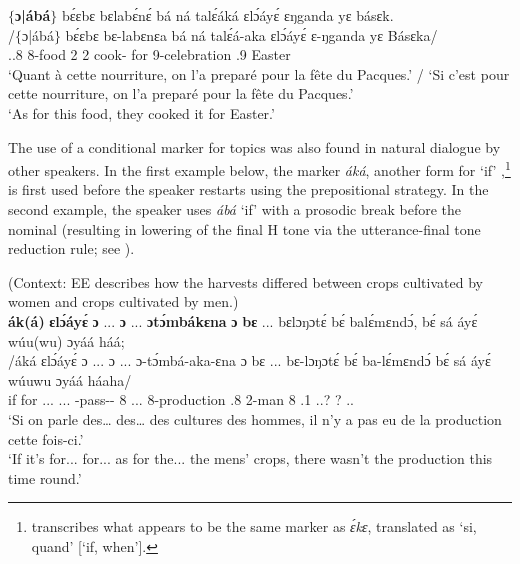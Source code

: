 \documentclass[output=paper,colorlinks,citecolor=brown
]{langscibook}
\begin{document}
\ea
\label{asforfoodaba}
\glll
{\db}\textbf{$\{$ɔ|ábá$\}$} bɛ́ɛbɛ bɛlabɛ́nɛ́ bá ná talɛ́áká ɛlɔ́áyɛ́ ɛŋganda yɛ básɛk. \\
/$\{$ɔ|ábá$\}$ bɛ́ɛbɛ bɛ-labɛnɛa bá ná talɛ́á-aka ɛlɔ́áyɛ́ ɛ-ŋganda yɛ Básɛka/ \\
{\db}\PREP{} \DEM{}.\PROX{}.8{} 8-food 2\SM{} \PST{}2{} cook-\DUR{} for 9-celebration \ASS{}.9 Easter \\
\glt
`Quant à cette nourriture, on l'a preparé pour la fête du Pacques.' / `Si c'est pour cette nourriture, on l'a preparé pour la fête du Pacques.' \\ `As for this food, they cooked it for Easter.' \jambox*{[JO 1650--1] }

\z

The use of a conditional marker for topics was also found in natural dialogue by other speakers. In the first example below, the marker \textit{áká}, another form for `if' \citep[212]{Dugast1971},\footnote{\citet[212, 318]{Dugast1971} transcribes what appears to be the same marker as \textit{ɛ́kɛ}, translated as `si, quand' [`if, when'].} is first used before the speaker restarts using the prepositional strategy. In the second example, the speaker uses \textit{ábá} `if' with a prosodic break before the nominal (resulting in lowering of the final H tone via the utterance-final tone reduction rule; see \citealp[72--74, 82]{KerrFut}).

\ea
(Context: EE describes how the harvests differed between crops cultivated by women and crops cultivated by men.)  \\
\glll
{\db}\textbf{ák(á)} \textbf{ɛlɔ́áyɛ́} \textbf{ɔ} ... \textbf{ɔ} ... \textbf{ɔtɔ́mbákɛna} \textbf{ɔ} \textbf{bɛ} ... bɛlɔŋɔtɛ́ bɛ́ balɛ́mɛndɔ́, bɛ́ sá áyɛ́ wúu(wu) ɔyáá háá; \\
/áká ɛlɔ́áyɛ́ ɔ ... ɔ ... ɔ-tɔ́mbá-aka-ɛna ɔ bɛ ... bɛ-lɔŋɔtɛ́ bɛ́ ba-lɛ́mɛndɔ́ bɛ́ sá áyɛ́ wúuwu ɔyáá háaha/ \\
{\db}if for \PREP{} ... \PREP{} ... \INF{}-pass-\DUR{}-\REP{} \PREP{} 8 ... 8-production \ASS{}.8 2-man 8\SM{} \NEG{} \PRO{}.1{} \DEM.\PROX.? ? \DEM.\PROX.\LOC{} \\
\glt
`Si on parle des… des… des cultures des hommes, il n’y a pas eu de la production cette fois-ci.' \\ `If it's for... for... as for the... the mens' crops, there wasn't the production this time round.' \jambox*{[EE 1700] }
\end{document}
